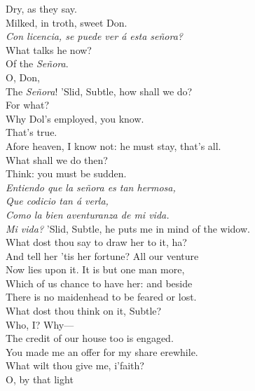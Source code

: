 \documentclass[a4paper,oneside,12pt]{memoir}
\begin{document}
\begin{drama*}
Dry, as they say.\\
\facespeaks {} Milked, in troth, sweet Don.\\
\surlyspeaks \emph{Con licencia, se puede ver \'{a} esta se\~{n}ora?}\\
\subtlespeaks What talks he now?\\
\facespeaks {} Of the \emph{Se\~{n}ora}.\\
\subtlespeaks {} O, Don,\\
The \emph{Se\~{n}ora}!
\facespeaks {} 'Slid, Subtle, how shall we do?\\
\subtlespeaks For what?\\
\facespeaks {} Why Dol's employed, you know.\\
\subtlespeaks {} That's true.\\
Afore heaven, I know not: he must stay, that's all.\\
\subtlespeaks What shall we do then?\\
\facespeaks {} Think: you must be sudden.\\
\surlyspeaks \emph{Entiendo que la se\~{n}ora es tan hermosa,\\
Que codicio tan \'{a} verla,\\
Como la bien aventuranza de mi vida.}\\
\facespeaks \emph{Mi vida?} 'Slid, Subtle, he puts me in mind of the widow.\\
What dost thou say to draw her to it, ha?\\
And tell her 'tis her fortune? All our venture\\
Now lies upon it. It is but one man more,\\
Which of us chance to have her: and beside\\
There is no maidenhead to be feared or lost.\\
What dost thou think on it, Subtle?\\
\subtlespeaks {} Who, I? Why---\\
\facespeaks The credit of our house too is engaged.\\
\subtlespeaks You made me an offer for my share erewhile.\\
What wilt thou give me, i'faith?\\
\facespeaks {} O, by that light\\

\end{drama*}
\end{document}
